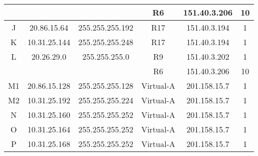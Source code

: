 \begin{tabular}{|c|c|c|c|c|c|}
 	   &              &                 & R6 & 151.40.3.206 & 10 \\
	\hline
	J & 20.86.15.64 & 255.255.255.192 & R17 & 151.40.3.194 & 1\\
 	\hline
	K & 10.31.25.144 & 255.255.255.248 & R17 & 151.40.3.194 & 1\\
 	\hline
	L & 20.26.29.0 & 255.255.255.0 & R9 & 151.40.3.202 & 1\\
	  &            &               & R6 & 151.40.3.206 & 10\\
	\hline
	M1 & 20.86.15.128 & 255.255.255.128 & Virtual-A &  201.158.15.7 & 1\\
	\hline
	M2 & 10.31.25.192 & 255.255.255.224 & Virtual-A &  201.158.15.7 & 1\\
	\hline
	N & 10.31.25.160 & 255.255.255.252 & Virtual-A & 201.158.15.7 & 1\\
	\hline
	O & 10.31.25.164 & 255.255.255.252 & Virtual-A & 201.158.15.7 & 1\\
	\hline
	P & 10.31.25.168 & 255.255.255.252 & Virtual-A & 201.158.15.7 & 1\\
	\hline
\end{tabular}



